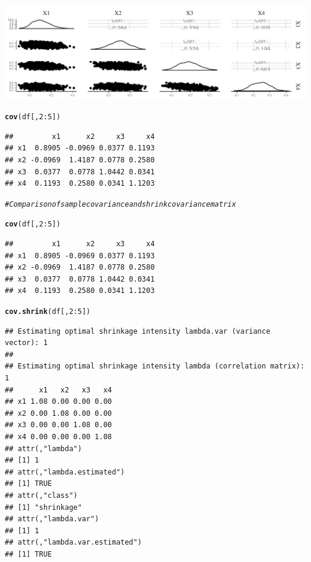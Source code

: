 \documentclass[11pt,a4paper,twoside]{book}\usepackage[]{graphicx}\usepackage[]{color}
\makeatletter
\newcommand{\hlnum}[1]{\textcolor[rgb]{0.686,0.059,0.569}{#1}}%
\newcommand{\hlcom}[1]{\textcolor[rgb]{0.678,0.584,0.686}{\textit{#1}}}%
\newcommand{\hlopt}[1]{\textcolor[rgb]{0,0,0}{#1}}%
\newcommand{\hlstd}[1]{\textcolor[rgb]{0.345,0.345,0.345}{#1}}%
\newcommand{\hlkwd}[1]{\textcolor[rgb]{0.737,0.353,0.396}{\textbf{#1}}}%
\newenvironment{kframe}{%
 \def\at@end@of@kframe{}%
 \ifinner\ifhmode%
  \def\at@end@of@kframe{\end{minipage}}%
  \begin{minipage}{\columnwidth}%
 \fi\fi%
 \def\FrameCommand##1{\hskip\@totalleftmargin \hskip-\fboxsep
 \colorbox{shadecolor}{##1}\hskip-\fboxsep
     \hskip-\linewidth \hskip-\@totalleftmargin \hskip\columnwidth}%
 \MakeFramed {\advance\hsize-\width
   \@totalleftmargin\z@ \linewidth\hsize
   \@setminipage}}%
 {\par\unskip\endMakeFramed%
 \at@end@of@kframe}
\newenvironment{knitrout}{}{} %
\makeatother
\begin{document}
\begin{knitrout}
{\centering \includegraphics[width=\textwidth-3cm]{figure/ch03_figcovuncertainty-1} 

}


\begin{kframe}\begin{alltt}
\hlkwd{cov}\hlstd{(df[,}\hlnum{2}\hlopt{:}\hlnum{5}\hlstd{])}
\end{alltt}
\begin{verbatim}
##         x1      x2     x3     x4
## x1  0.8905 -0.0969 0.0377 0.1193
## x2 -0.0969  1.4187 0.0778 0.2580
## x3  0.0377  0.0778 1.0442 0.0341
## x4  0.1193  0.2580 0.0341 1.1203
\end{verbatim}
\end{kframe}
\end{knitrout}

\begin{knitrout}
\color{fgcolor}\begin{kframe}
\begin{alltt}
\hlcom{#Comparison of sample covariance and shrink covariance matrix}

\hlkwd{cov}\hlstd{(df[,}\hlnum{2}\hlopt{:}\hlnum{5}\hlstd{])}
\end{alltt}
\begin{verbatim}
##         x1      x2     x3     x4
## x1  0.8905 -0.0969 0.0377 0.1193
## x2 -0.0969  1.4187 0.0778 0.2580
## x3  0.0377  0.0778 1.0442 0.0341
## x4  0.1193  0.2580 0.0341 1.1203
\end{verbatim}
\begin{alltt}
\hlkwd{cov.shrink}\hlstd{(df[,}\hlnum{2}\hlopt{:}\hlnum{5}\hlstd{])}
\end{alltt}
\begin{verbatim}
## Estimating optimal shrinkage intensity lambda.var (variance vector): 1 
## 
## Estimating optimal shrinkage intensity lambda (correlation matrix): 1
##      x1   x2   x3   x4
## x1 1.08 0.00 0.00 0.00
## x2 0.00 1.08 0.00 0.00
## x3 0.00 0.00 1.08 0.00
## x4 0.00 0.00 0.00 1.08
## attr(,"lambda")
## [1] 1
## attr(,"lambda.estimated")
## [1] TRUE
## attr(,"class")
## [1] "shrinkage"
## attr(,"lambda.var")
## [1] 1
## attr(,"lambda.var.estimated")
## [1] TRUE
\end{verbatim}
\end{kframe}
\end{knitrout}
\end{document}
